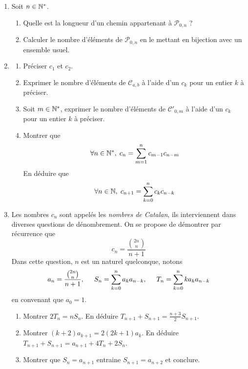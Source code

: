 \begin{enumerate}
 \item Soit $n\in \mathbb{N}^*$.
\begin{enumerate} 
 \item Quelle est la longueur d'un chemin appartenant à $\mathcal{P}_{0,n}$ ?
 \item Calculer le nombre d'éléments de $\mathcal{P}_{0,n}$ en le mettant en bijection avec un ensemble usuel.
\end{enumerate}
\item 
\begin{enumerate}
 \item Préciser $c_1$ et $c_2$.
 \item Exprimer le nombre d'éléments de $\mathcal{C}_{a,b}$ à l'aide d'un $c_k$ pour un entier $k$ à préciser.
 \item Soit $m\in \mathbb{N}^*$, exprimer le nombre d'éléments de $\mathcal{C}'_{0,m}$ à l'aide d'un $c_k$ pour un entier $k$ à préciser.
 \item Montrer que
\begin{displaymath}
 \forall n\in \mathbb{N}^*,\; c_n =\sum_{m=1}^{n}c_{m-1}c_{n-m} 
\end{displaymath}
En déduire que
\begin{displaymath}
 \forall n\in \mathbb{N},\; c_{n+1} =\sum_{k=0}^{n}c_{k}c_{n-k} 
\end{displaymath}
\end{enumerate}
\item Les nombres $c_n$ sont appelés les \emph{nombres de Catalan}, ils interviennent dans diverses questions de dénombrement. On se propose de démontrer par récurrence que
\begin{displaymath}
 c_n = \frac{\binom{2n}{n}}{n+1}
\end{displaymath}
Dans cette question, $n$ est un naturel quelconque, notons
\begin{displaymath}
 a_n= \frac{\binom{2n}{n}}{n+1}
,\hspace{0.5cm} S_{n} =\sum_{k=0}^{n}a_{k}a_{n-k}
,\hspace{0.5cm} T_{n} =\sum_{k=0}^{n}ka_{k}a_{n-k}
\end{displaymath}
en convenant que $a_0=1$. 
\begin{enumerate}
 \item Montrer $2T_n = n S_n$. En déduire $T_{n+1}+S_{n+1} = \frac{n+3}{2}S_{n+1}$.
 \item Montrer $(k+2)a_{k+1} = 2(2k+1)a_k$. En déduire $ T_{n+1}+S_{n+1} = a_{n+1} + 4T_n +2S_n $.
 \item Montrer que $S_n=a_{n+1}$ entraine $S_{n+1}=a_{n+2}$ et conclure.
\end{enumerate}

\end{enumerate}
